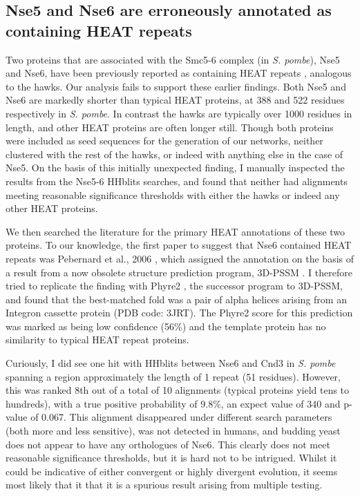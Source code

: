 \documentclass[a4paper,11pt,twoside,openright]{scrbook}
\begin{document}
\subsection{Nse5 and Nse6 are erroneously annotated as containing HEAT repeats}
Two proteins that are associated with the Smc5-6 complex (in \textit{S. pombe}), Nse5 and Nse6, have been previously reported as containing HEAT repeats \cite{Stephan2011,Palecek2015,Alt2017}, analogous to the hawks. Our analysis fails to support these earlier findings. Both Nse5 and Nse6 are markedly shorter than typical HEAT proteins, at 388 and 522 residues respectively in \textit{S. pombe}. In contrast the hawks are typically over 1000 residues in length, and other HEAT proteins are often longer still. Though both proteins were included as seed sequences for the generation of our networks, neither clustered with the rest of the hawks, or indeed with anything else in the case of Nse5. On the basis of this initially unexpected finding, I manually inspected the results from the Nse5-6 HHblits searches, and found that neither had alignments meeting reasonable significance thresholds with either the hawks or indeed any other HEAT proteins.

We then searched the literature for the primary HEAT annotations of these two proteins. To our knowledge, the first paper to suggest that Nse6 contained HEAT repeats was Pebernard et al., 2006 \cite{Pebernard2006}, which assigned the annotation on the basis of a result from a now obsolete structure prediction program, 3D-PSSM \cite{Kelley2000}. I therefore tried to replicate the finding with Phyre2 \cite{Kelley2015}, the successor program to 3D-PSSM, and found that the best-matched fold was a pair of alpha helices arising from an Integron cassette protein (PDB code: 3JRT). The Phyre2 score for this prediction was marked as being low confidence (56\%) and the template protein has no similarity to typical HEAT repeat proteins.

Curiously, I did see one hit with HHblits between Nse6 and Cnd3 in \textit{S. pombe} spanning a region approximately the length of 1 repeat (51 residues). However, this was ranked 8th out of a total of 10 alignments (typical proteins yield tens to hundreds), with a true positive probability of 9.8\%, an expect value of 340 and p-value of 0.067. This alignment disappeared under different search parameters (both more and less sensitive), was not detected in humans, and budding yeast does not appear to have any orthologues of Nse6. This clearly does not meet reasonable significance thresholds, but it is hard not to be intrigued. Whilst it could be indicative of either convergent or highly divergent evolution, it seems most likely that it that it is a spurious result arising from multiple testing.
\end{document}
